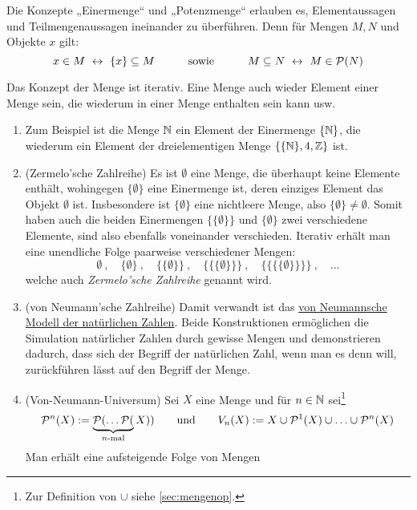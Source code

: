 \begin{bem}
    Die Konzepte „Einermenge“ und „Potenzmenge“ erlauben es, Elementaussagen und Teilmengenaussagen ineinander zu überführen. Denn für Mengen $M,N$ und Objekte $x$ gilt:
        \[ x\in M\ \leftrightarrow\ \{x\}\subseteq M \quad\qquad\text{sowie}\quad\qquad M\subseteq N\  \leftrightarrow\ M\in \calP(N) \]
\end{bem}


\begin{vorschau} \label{mengeniterativ}
    Das Konzept der Menge ist iterativ. Eine Menge auch wieder Element einer Menge sein, die wiederum in einer Menge enthalten sein kann usw.
    \begin{enumerate}[(1)]
        \item Zum Beispiel ist die Menge $\mathbb N$ ein Element der Einermenge $\{\mathbb N\}$, die wiederum ein Element der dreielementigen Menge $\{ \{\mathbb N \}, 4, \mathbb Z\}$ ist.
        \item(Zermelo'sche Zahlreihe) Es ist $\emptyset$ eine Menge, die überhaupt keine Elemente enthält, wohingegen $\{\emptyset\}$ eine Einermenge ist, deren einziges Element das Objekt $\emptyset$ ist. Insbesondere ist $\{\emptyset\}$ eine nichtleere Menge, also $\{\emptyset\}\neq \emptyset$. Somit haben auch die beiden Einermengen $\{\{\emptyset\}\}$ und $\{\emptyset\}$ zwei verschiedene Elemente, sind also ebenfalls voneinander verschieden. Iterativ erhält man eine unendliche Folge paarweise verschiedener Mengen:
        \[ \emptyset \ ,\quad \{\emptyset\} \ ,\quad \{\{\emptyset\}\} \ ,\quad \{\{\{\emptyset\}\}\} \ , \quad \{\{\{\{\emptyset\}\}\}\} \ ,\quad \dots \]
        welche auch \emph{Zermelo'sche Zahlreihe} genannt wird.
        \item(von Neumann'sche Zahlreihe) Damit verwandt ist das \href{https://de.wikipedia.org/wiki/Nat\%C3\%BCrliche_Zahl#Von_Neumanns_Modell_der_nat\%C3\%BCrlichen_Zahlen}{von Neumannsche Modell der natürlichen Zahlen}. Beide Konstruktionen ermöglichen die Simulation natürlicher Zahlen durch gewisse Mengen und demonstrieren dadurch, dass sich der Begriff der natürlichen Zahl, wenn man es denn will, zurückführen lässt auf den Begriff der Menge.
        \item(Von-Neumann-Universum) Sei $X$ eine Menge und für $n \in \mathbb N$ sei\footnote{Zur Definition von $\cup$ siehe \cref{sec:mengenop}.}
        \[ \mathcal P^n(X):=\underbrace{\mathcal P(\dots\mathcal P(}_{n\text{-mal}}X)) \qquad\text{und}\qquad V_n(X):=X\cup\mathcal P^1(X)\cup\ldots\cup \mathcal P^n(X) \]
        Man erhält eine aufsteigende Folge von Mengen

\end{enumerate}
\end{vorschau}
